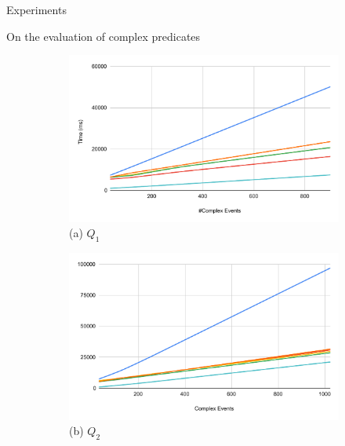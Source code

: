 \documentclass[xcolor=pdftex,dvipsnames,table]{beamer}
\begin{document}

\begin{frame}{Experiments}
  \begin{block}{On the evaluation of complex predicates}
    \begin{figure}[H]
        \centering
        \begin{subfigure}[b]{0.40\textwidth}
            \centering
            \includegraphics[width=\textwidth]{experiment_1_chart_1}
            \tiny (a) $Q_{1}$
        \end{subfigure}
        \begin{subfigure}[b]{0.40\textwidth}
            \centering
            \includegraphics[width=\textwidth]{experiment_1_chart_2}
            \tiny (b) $Q_{2}$
        \end{subfigure}
        \begin{center}
          \begin{subfigure}[b]{0.40\textwidth}
              \centering

\end{subfigure}
\end{center}
\end{figure}
\end{block}
\end{frame}
\end{document}
